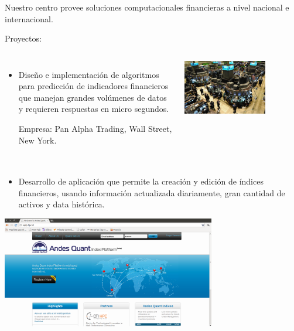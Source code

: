 \frame
{
\frametitle{}

Nuestro centro provee soluciones computacionales financieras a nivel nacional e
internacional.

Proyectos:


\begin{columns}
\begin{itemize}
\item Diseño e implementación de algoritmos para predicción de indicadores financieros que manejan grandes volúmenes de datos y requieren respuestas en micro segundos. 

Empresa: Pan Alpha Trading, Wall Street, New York.
\end{itemize}
\includegraphics[width=0.7\textwidth]{img/wallstreet}
\end{columns}

}

\frame
{
\frametitle{}

\begin{itemize}
\item Desarrollo de aplicación que permite la creación y edición de índices financieros, usando información actualizada diariamente, gran cantidad de activos y data histórica.
\end{itemize}
\begin{center}
 \includegraphics[width=0.7\textwidth]{img/ETF}
\end{center}





}


